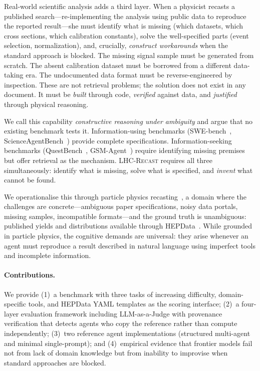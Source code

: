 \documentclass{article}
\newcommand{\toolkit}{\textsc{LHC-Recast}}
\begin{document}
Real-world scientific analysis adds a third layer.
When a physicist recasts a published search---re-implementing the analysis using public data to reproduce the reported result---she must identify what is missing (which datasets, which cross sections, which calibration constants), solve the well-specified parts (event selection, normalization), and, crucially, \emph{construct workarounds} when the standard approach is blocked.
The missing signal sample must be generated from scratch.
The absent calibration dataset must be borrowed from a different data-taking era.
The undocumented data format must be reverse-engineered by inspection.
These are not retrieval problems; the solution does not exist in any document.
It must be \emph{built} through code, \emph{verified} against data, and \emph{justified} through physical reasoning.

We call this capability \emph{constructive reasoning under ambiguity} and argue that no existing benchmark tests it.
Information-using benchmarks (SWE-bench~\citep{jimenez2024swebench}, ScienceAgentBench~\citep{chen2024scienceagentbench}) provide complete specifications.
Information-seeking benchmarks (QuestBench~\citep{li2025questbench}, GSM-Agent~\citep{zhu2025gsmagent}) require identifying missing premises but offer retrieval as the mechanism.
\toolkit{} requires all three simultaneously: identify what is missing, solve what is specified, and \emph{invent} what cannot be found.

We operationalise this through particle physics recasting~\citep{cranmer2012recast, abdallah2020reinterpretation}, a domain where the challenges are concrete---ambiguous paper specifications, noisy data portals, missing samples, incompatible formats---and the ground truth is unambiguous: published yields and distributions available through HEPData~\citep{maguire2017hepdata}.
While grounded in particle physics, the cognitive demands are universal: they arise whenever an agent must reproduce a result described in natural language using imperfect tools and incomplete information.

\paragraph{Contributions.}
We provide (1)~a benchmark with three tasks of increasing difficulty, domain-specific tools, and HEPData YAML templates as the scoring interface; (2)~a four-layer evaluation framework including LLM-as-a-Judge with provenance verification that detects agents who copy the reference rather than compute independently; (3)~two reference agent implementations (structured multi-agent and minimal single-prompt); and (4)~empirical evidence that frontier models fail not from lack of domain knowledge but from inability to improvise when standard approaches are blocked.
\end{document}
